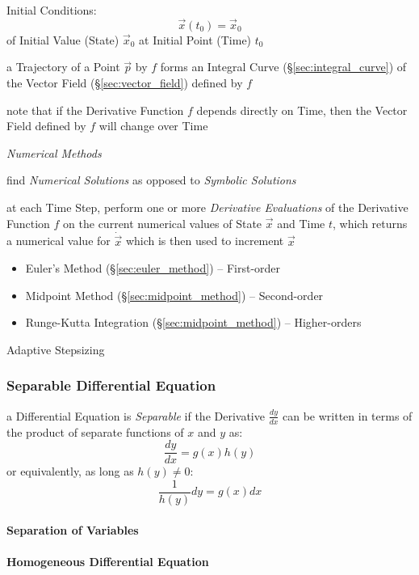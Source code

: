 Initial Conditions:
\[
  \vec{x}(t_0) = \vec{x}_0
\]
of Initial Value (State) $\vec{x}_0$ at Initial Point (Time) $t_0$

a Trajectory of a Point $\vec{p}$ by $f$ forms an Integral Curve
(\S\ref{sec:integral_curve}) of the Vector Field (\S\ref{sec:vector_field})
defined by $f$

note that if the Derivative Function $f$ depends directly on Time, then the
Vector Field defined by $f$ will change over Time

\emph{Numerical Methods}

find \emph{Numerical Solutions} as opposed to \emph{Symbolic Solutions}

at each Time Step, perform one or more \emph{Derivative Evaluations} of the
Derivative Function $f$ on the current numerical values of State $\vec{x}$ and
Time $t$, which returns a numerical value for $\dot{\vec{x}}$ which is then used
to increment $\vec{x}$

\begin{itemize}
\item Euler's Method (\S\ref{sec:euler_method}) -- First-order
\item Midpoint Method (\S\ref{sec:midpoint_method}) -- Second-order
\item Runge-Kutta Integration (\S\ref{sec:midpoint_method}) -- Higher-orders
\end{itemize}

Adaptive Stepsizing



\subsubsection{Separable Differential Equation}\label{sec:separable}

a Differential Equation is \emph{Separable} if the Derivative $\frac{dy}{dx}$
can be written in terms of the product of separate functions of $x$ and $y$ as:
\[
  \frac{dy}{dx} = g(x)h(y)
\]
or equivalently, as long as $h(y) \neq 0$:
\[
  \frac{1}{h(y)} dy = g(x) dx
\]



\paragraph{Separation of Variables}\label{sec:separation_of_variables}\hfill

\paragraph{Homogeneous Differential Equation}
\label{sec:homogeneous_differential_equation}

